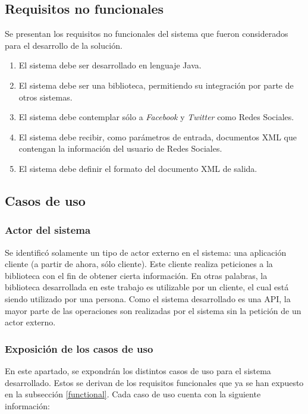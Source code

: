 \subsection{Requisitos no funcionales}

Se presentan los requisitos no funcionales del sistema que fueron considerados para el desarrollo de la solución.
\begin{enumerate}
\item El sistema debe ser desarrollado en lenguaje Java.
\item El sistema debe ser una biblioteca, permitiendo su integración por parte de otros sistemas.
\item El sistema debe contemplar sólo a \textit{Facebook} y \textit{Twitter} como Redes Sociales.
\item El sistema debe recibir, como parámetros de entrada, documentos XML que contengan la información del usuario de Redes Sociales.
\item El sistema debe definir el formato del documento XML de salida.
\end{enumerate}

\subsection{Casos de uso}

\subsubsection{Actor del sistema}

Se identificó solamente un tipo de actor externo en el sistema: una aplicación cliente (a partir de ahora, sólo cliente). Este cliente realiza peticiones a la biblioteca con el fin de obtener cierta información. En otras palabras, la biblioteca desarrollada en este trabajo es utilizable por un cliente, el cual está siendo utilizado por una persona. Como el sistema desarrollado es una API, la mayor parte de las operaciones son realizadas por el sistema sin la petición de un actor externo.

\subsubsection{Exposición de los casos de uso}

En este apartado, se expondrán los distintos casos de uso para el sistema desarrollado. Estos se derivan de los requisitos funcionales que ya se han expuesto en la subsección \ref{functional}. Cada caso de uso cuenta con la siguiente información:

